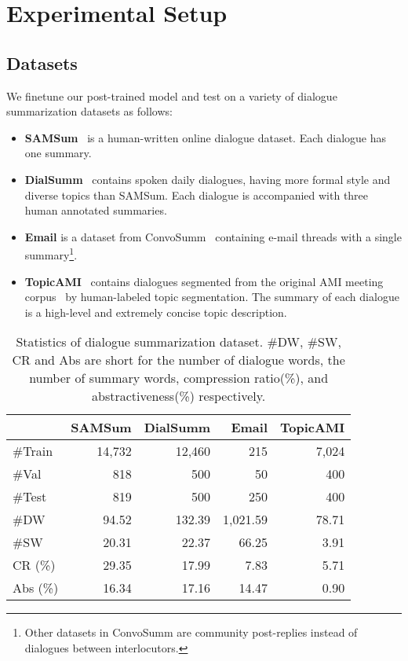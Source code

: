 \section{Experimental Setup}
\label{sec:experiment}

\subsection{Datasets}\label{sec:datasets}
We finetune our post-trained model and test on a variety of 
dialogue summarization datasets as follows:
\begin{itemize}
 \item \textbf{SAMSum}~\cite{gliwa2019samsum} is a human-written online dialogue dataset. Each dialogue has one summary.
 \item \textbf{DialSumm}~\cite{chen2021dialsumm} contains spoken daily dialogues, having more formal style and diverse topics than SAMSum. Each dialogue is accompanied with three human annotated summaries.
 \item \textbf{Email} is a dataset from ConvoSumm~\cite{fabbri2021convosumm} containing e-mail threads with a single summary\footnote{Other datasets in ConvoSumm are community post-replies instead of dialogues between interlocutors.}.
 \item \textbf{TopicAMI}~\cite{goo2018abstractive} contains dialogues segmented from the original AMI meeting corpus~\cite{mccowan2005ami} by human-labeled topic segmentation. The summary of each dialogue is a high-level and extremely concise topic description.
\end{itemize}


\begin{table}
	\small
	\centering
	\begin{tabular}{lrrrr}
		\toprule[1pt]
		\textbf{} & \textbf{SAMSum} & \textbf{DialSumm}& \textbf{Email} & \textbf{TopicAMI}\\ 
		\midrule[1pt]
		{\#Train} &14,732 &12,460 &215 &7,024  \\
		{\#Val} & 818& 500& 50& 400 \\
		{\#Test} & 819&500 &250 &400  \\
		{\#DW} &94.52 &132.39 &1,021.59 &78.71 \\
		{\#SW} & 20.31&22.37 &66.25 & 3.91\\
		{CR (\%)} & 29.35&17.99 &7.83 &5.71 \\
		{Abs (\%)} & 16.34& 17.16&14.47 &0.90 \\

		\bottomrule[1pt]
	\end{tabular}
	\caption{Statistics of dialogue summarization dataset. \#DW, \#SW, CR and Abs are short for the number of dialogue words, the number of summary words, compression ratio(\%), and abstractiveness(\%) respectively.}
	\label{tab:sumdataset}
\end{table}

